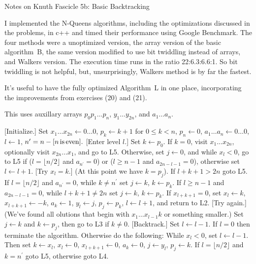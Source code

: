 \def\newstep#1{\smallskip \noindent {\bf #1}}
\def\newprob#1{\vskip 0.12in \noindent {\bf #1}}

\topglue 0.5in
\centerline{Notes on Knuth Fascicle 5b: Basic Backtracking}
\vskip 0.3in


I implemented the N-Queens algorithms, including the optimizations
discussed in the problems, in c++ and timed their performance using
Google Benchmark.  The four methods were a  unoptimized
version, the array version of the basic algorithm~B, the
same version modified to use bit twiddling instead of arrays,
and Walkers version.  The execution time runs in the ratio
22:6.3:6.6:1.  So bit twiddling is not helpful, but, unsurprisingly,
Walkers method is by far the fastest.

\vskip 0.1in

It's useful to have the fully optimized Algorithm~L in one place, incorporating
the improvements from exercises (20) and (21).

\noindent This uses auxillary arrays $p_0 p_1 \ldots p_n$, $y_1 \ldots y_{2n}$, and
$a_1 \ldots a_n$.

 [Initialize.] Set $x_1 \ldots x_{2 n} \leftarrow 0 \ldots 0$,
$p_k \leftarrow k + 1$ for $0 \leq k < n$, $p_n \leftarrow 0$, 
$a_{1} \ldots a_{n} \leftarrow 0 \ldots 0$, $l \leftarrow 1$,
$n^{\prime} = n - [n \rm{\, is\, even}].$
\vskip 0.05in
 [Enter level $l$.] Set $k \gets p_0$.  If $k = 0$, visit
$x_1 \ldots x_{2n}$, optionally visit $x_{2n} \ldots x_1$, and 
go to L5.  Otherwise, set $j \leftarrow 0$, and
while $x_l < 0$, go to L5 if ($l = \lfloor n / 2 \rfloor$ and $a_{n^{\prime}} = 0$) 
or ($l \ge n - 1$ and $a_{2n - l - 1} = 0$), otherwise
set $l \leftarrow l + 1$.
\vskip 0.05in
 [Try $x_l = k$.] (At this point we have $k = p_j$).  If $l + k + 1 > 2n$
goto L5.  If $l = \lfloor n / 2 \rfloor$ and $a_{n^{\prime}} = 0$, while $k \ne n^{\prime}$
set $j \leftarrow k$, $k \leftarrow p_k$.  If $l \ge n - 1$ and $a_{2n - l - 1} = 0$, 
while $l + k + 1 \ne 2 n $ set $j \leftarrow k$, $k \leftarrow p_k$.  If $x_{l + k + 1} = 0$, 
set $x_l \leftarrow k$, $x_{l + k + 1} \leftarrow -k$,
$a_k \leftarrow 1$, $y_l \leftarrow j$, $p_j \leftarrow p_k$, $l \leftarrow l + 1$, and return to L2.
\vskip 0.05in
 [Try again.] (We've found all olutions that begin with $x_1 \ldots x_{l-1} k$
or something smaller.) Set $j \leftarrow k$ and $k \leftarrow p_j$, then go to L3 if $k \ne 0$.
\vskip 0.05in
 [Backtrack.] Set $l \leftarrow l - 1$.   If $l = 0$ then terminate the algorithm.
Otherwise do the following: While $x_l < 0$, set $l \leftarrow l - 1$.  Then set 
$k \leftarrow x_l$, $x_l \leftarrow 0$, $x_{l + k + 1} \leftarrow 0$, $a_k \leftarrow 0$, 
$j \leftarrow y_l$, $p_j \leftarrow k$.  If $l = \lfloor n / 2 \rfloor$ and $k = n^{\prime}$
goto L5, otherwise goto L4.

\bye